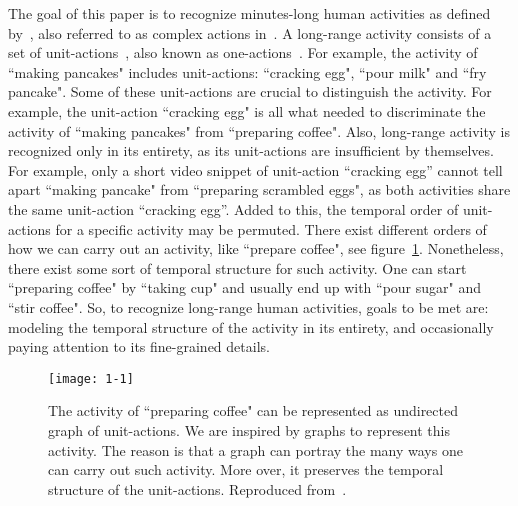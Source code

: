 \documentclass[10pt,twocolumn,letterpaper]{article}
\begin{document}
The goal of this paper is to recognize minutes-long human activities as defined by~\cite{kuehne2014language}, also referred to as complex actions in~\cite{hussein2018timeception}.
A long-range activity consists of a set of unit-actions~\cite{kuehne2014language}, also known as one-actions~\cite{hussein2018timeception}.
For example, the activity of ``making pancakes" includes unit-actions: ``cracking egg", ``pour milk" and ``fry pancake".
Some of these unit-actions are crucial to distinguish the activity. 
For example, the unit-action ``cracking egg" is all what needed to discriminate the activity of ``making pancakes" from ``preparing coffee".
Also, long-range activity is recognized only in its entirety, as its unit-actions are insufficient by themselves.
For example, only a short video snippet of unit-action ``cracking egg” cannot tell apart ``making  pancake" from ``preparing scrambled eggs", as both activities share the same unit-action ``cracking egg”.
Added to this, the temporal order of unit-actions for a specific activity may be permuted.
There exist different orders of how we can carry out an activity, like ``prepare coffee", see figure~\ref{fig:1-1}.
Nonetheless, there exist some sort of temporal structure for such activity.
One can start ``preparing coffee" by ``taking cup" and usually end up with ``pour sugar" and ``stir coffee".
So, to recognize long-range human activities, goals to be met are: modeling the temporal structure of the activity in its entirety, and occasionally paying attention to its fine-grained details.

\begin{figure}[!t]
\begin{center}
\texttt{[image: 1-1]}
\end{center}
\caption{The activity of ``preparing coffee" can be represented as undirected graph of unit-actions.
We are inspired by graphs to represent this activity.
The reason is that a graph can portray the many ways one can carry out such activity.
More over, it preserves the temporal structure of the unit-actions.
Reproduced from~\cite{kuehne2014language}.}
\label{fig:1-1}
\vspace*{-5mm}
\end{figure}
\end{document}
